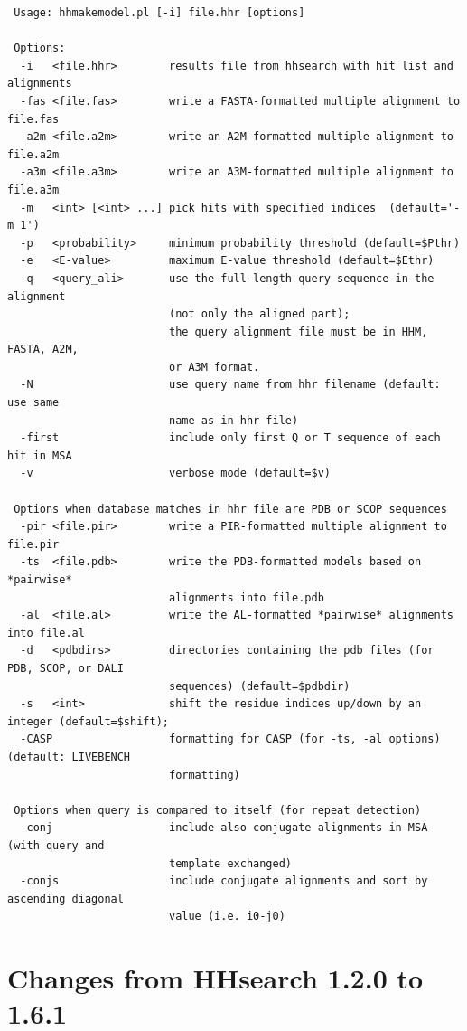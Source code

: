 \documentclass[11pt,a4paper]{article}
\begin{document}
\small \begin{verbatim}
 Usage: hhmakemodel.pl [-i] file.hhr [options]

 Options:
  -i   <file.hhr>        results file from hhsearch with hit list and alignments
  -fas <file.fas>        write a FASTA-formatted multiple alignment to file.fas
  -a2m <file.a2m>        write an A2M-formatted multiple alignment to file.a2m
  -a3m <file.a3m>        write an A3M-formatted multiple alignment to file.a3m
  -m   <int> [<int> ...] pick hits with specified indices  (default='-m 1')
  -p   <probability>     minimum probability threshold (default=$Pthr)        
  -e   <E-value>         maximum E-value threshold (default=$Ethr)        
  -q   <query_ali>       use the full-length query sequence in the alignment 
                         (not only the aligned part);
                         the query alignment file must be in HHM, FASTA, A2M,  
                         or A3M format.
  -N                     use query name from hhr filename (default: use same  
                         name as in hhr file)
  -first                 include only first Q or T sequence of each hit in MSA
  -v                     verbose mode (default=$v)

 Options when database matches in hhr file are PDB or SCOP sequences
  -pir <file.pir>        write a PIR-formatted multiple alignment to file.pir 
  -ts  <file.pdb>        write the PDB-formatted models based on *pairwise*  
                         alignments into file.pdb
  -al  <file.al>         write the AL-formatted *pairwise* alignments into file.al
  -d   <pdbdirs>         directories containing the pdb files (for PDB, SCOP, or DALI  
                         sequences) (default=$pdbdir)
  -s   <int>             shift the residue indices up/down by an integer (default=$shift);           
  -CASP                  formatting for CASP (for -ts, -al options) (default: LIVEBENCH  
                         formatting)

 Options when query is compared to itself (for repeat detection) 
  -conj                  include also conjugate alignments in MSA (with query and  
                         template exchanged) 
  -conjs                 include conjugate alignments and sort by ascending diagonal  
                         value (i.e. i0-j0)
\end{verbatim} \normalsize



\section{Changes from HHsearch 1.2.0 to 1.6.1}
\end{document}
